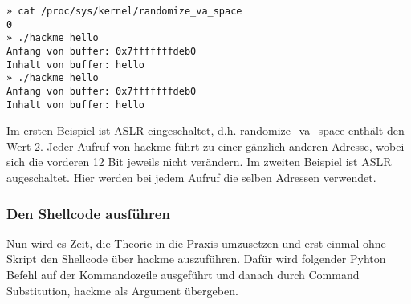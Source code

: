 \documentclass[12pt]{article}
\begin{document}
\begin{lstlisting}[caption={ASLR disabled}, captionpos=t]
» cat /proc/sys/kernel/randomize_va_space     
0
» ./hackme hello                              
Anfang von buffer: 0x7fffffffdeb0
Inhalt von buffer: hello
» ./hackme hello
Anfang von buffer: 0x7fffffffdeb0
Inhalt von buffer: hello
\end{lstlisting}
Im ersten Beispiel ist ASLR eingeschaltet, d.h. randomize\_va\_space enthält den Wert 2. Jeder Aufruf von hackme führt zu einer gänzlich anderen Adresse, wobei sich die vorderen 12 Bit jeweils nicht verändern.
\newline
Im zweiten Beispiel ist ASLR augeschaltet. Hier werden bei jedem Aufruf die selben Adressen verwendet.

\subsubsection{Den Shellcode ausführen}
Nun wird es Zeit, die Theorie in die Praxis umzusetzen und erst einmal ohne Skript den Shellcode über hackme auszuführen. Dafür wird folgender Pyhton Befehl auf der Kommandozeile ausgeführt und danach durch Command Substitution, hackme als Argument übergeben.
\begin{lstlisting}

\end{lstlisting}
\end{document}
